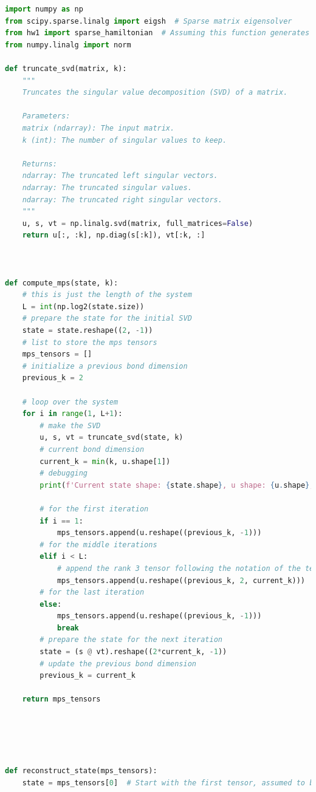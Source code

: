 \documentclass[12pt]{article}
\begin{document}
\begin{lstlisting}[language=Python]
import numpy as np
from scipy.sparse.linalg import eigsh  # Sparse matrix eigensolver
from hw1 import sparse_hamiltonian  # Assuming this function generates your Hamiltonian
from numpy.linalg import norm

def truncate_svd(matrix, k):
    """
    Truncates the singular value decomposition (SVD) of a matrix.

    Parameters:
    matrix (ndarray): The input matrix.
    k (int): The number of singular values to keep.

    Returns:
    ndarray: The truncated left singular vectors.
    ndarray: The truncated singular values.
    ndarray: The truncated right singular vectors.
    """
    u, s, vt = np.linalg.svd(matrix, full_matrices=False)
    return u[:, :k], np.diag(s[:k]), vt[:k, :]



def compute_mps(state, k):
    # this is just the length of the system
    L = int(np.log2(state.size))
    # prepare the state for the initial SVD
    state = state.reshape((2, -1))
    # list to store the mps tensors
    mps_tensors = []
    # initialize a previous bond dimension
    previous_k = 2

    # loop over the system
    for i in range(1, L+1):
        # make the SVD
        u, s, vt = truncate_svd(state, k)
        # current bond dimension
        current_k = min(k, u.shape[1])
        # debugging
        print(f'Current state shape: {state.shape}, u shape: {u.shape}, s shape: {s.shape}, vt shape: {vt.shape}')

        # for the first iteration
        if i == 1:
            mps_tensors.append(u.reshape((previous_k, -1)))
        # for the middle iterations
        elif i < L:
            # append the rank 3 tensor following the notation of the tensor network diagrams
            mps_tensors.append(u.reshape((previous_k, 2, current_k)))
        # for the last iteration
        else:
            mps_tensors.append(u.reshape((previous_k, -1)))
            break
        # prepare the state for the next iteration
        state = (s @ vt).reshape((2*current_k, -1))
        # update the previous bond dimension
        previous_k = current_k

    return mps_tensors





def reconstruct_state(mps_tensors):
    state = mps_tensors[0]  # Start with the first tensor, assumed to be a matrix.


\end{lstlisting}
\end{document}
